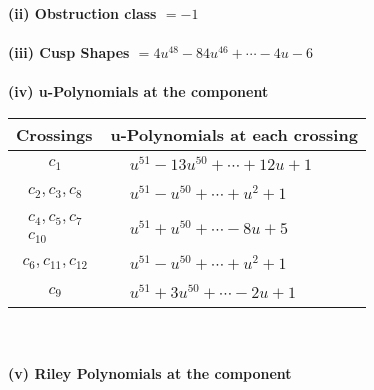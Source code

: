 \documentclass[1p]{elsarticle_modified}
\theoremstyle{definition}
\begin{document}
\flushleft \textbf{(ii) Obstruction class $= -1$}\\~\\
\flushleft \textbf{(iii) Cusp Shapes $= 4 u^{48}-84 u^{46}+\cdots-4 u-6$}\\~\\
\newpage\renewcommand{\arraystretch}{1}
\flushleft \textbf{(iv) u-Polynomials at the component}\newline \\
\begin{tabular}{m{50pt}|m{274pt}}
Crossings & \hspace{64pt}u-Polynomials at each crossing \\
\hline $$\begin{aligned}c_{1}\end{aligned}$$&$\begin{aligned}
&u^{51}-13 u^{50}+\cdots+12 u+1
\end{aligned}$\\
\hline $$\begin{aligned}c_{2},c_{3},c_{8}\end{aligned}$$&$\begin{aligned}
&u^{51}- u^{50}+\cdots+u^2+1
\end{aligned}$\\
\hline $$\begin{aligned}c_{4},c_{5},c_{7}\\c_{10}\end{aligned}$$&$\begin{aligned}
&u^{51}+u^{50}+\cdots-8 u+5
\end{aligned}$\\
\hline $$\begin{aligned}c_{6},c_{11},c_{12}\end{aligned}$$&$\begin{aligned}
&u^{51}- u^{50}+\cdots+u^2+1
\end{aligned}$\\
\hline $$\begin{aligned}c_{9}\end{aligned}$$&$\begin{aligned}
&u^{51}+3 u^{50}+\cdots-2 u+1
\end{aligned}$\\
\hline
\end{tabular}\\~\\
\newpage\renewcommand{\arraystretch}{1}
\flushleft \textbf{(v) Riley Polynomials at the component}\newline \\
\end{document}
